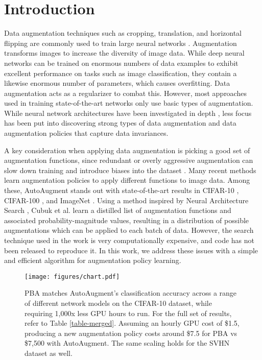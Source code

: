 \documentclass{article}
\begin{document}
\section{Introduction}
\label{intro}

Data augmentation techniques such as cropping, translation, and horizontal flipping are commonly used to train large neural networks \cite{nin}. Augmentation transforms images to increase the diversity of image data. While deep neural networks can be trained on enormous numbers of data examples to exhibit excellent performance on tasks such as image classification, they contain a likewise enormous number of parameters, which causes overfitting. Data augmentation acts as a regularizer to combat this. However, most approaches used in training state-of-the-art networks only use basic types of augmentation. While neural network architectures have been investigated in depth \cite{alexnet, resnet, googlenet, vgg, wrn, densenet, pyramidnet}, less focus has been put into discovering strong types of data augmentation and data augmentation policies that capture data invariances.

A key consideration when applying data augmentation is picking a good set of augmentation functions, since redundant or overly aggressive augmentation can slow down training and introduce biases into the dataset \cite{Graham14a}. Many recent methods learn augmentation policies to apply different functions to image data. Among these, AutoAugment \cite{autoaug} stands out with state-of-the-art results in CIFAR-10 \cite{cifar}, CIFAR-100 \cite{cifar}, and ImageNet \cite{imagenet}. Using a method inspired by Neural Architecture Search \cite{NAS1}, Cubuk et al. learn a distilled list of augmentation functions and associated probability-magnitude values, resulting in a distribution of possible augmentations which can be applied to each batch of data. However, the search technique used in the work is very computationally expensive, and code has not been released to reproduce it. In this work, we address these issues with a simple and efficient algorithm for augmentation policy learning.

\begin{figure}[t]
  \centering
  \texttt{[image: figures/chart.pdf]}
     \vspace{-.3cm}
  \caption{PBA matches AutoAugment's classification accuracy across a range of different network models on the CIFAR-10 dataset, while requiring 1,000x less GPU hours to run. For the full set of results, refer to Table \ref{table-merged}. Assuming an hourly GPU cost of \$1.5, producing a new augmentation policy costs around \$7.5 for PBA vs \$7,500 with AutoAugment. The same scaling holds for the SVHN dataset as well.}
  \label{fig:chart}
\end{figure}
\end{document}
